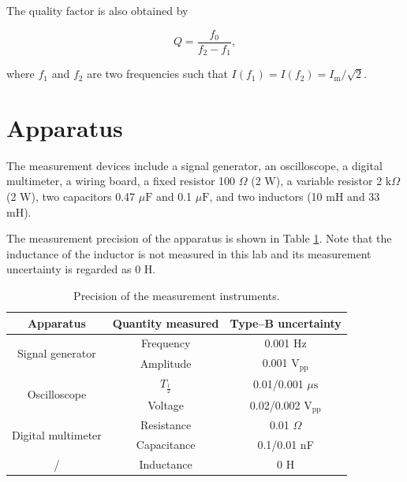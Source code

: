 \documentclass{article}
\begin{document}
The quality factor is also obtained by

\begin{equation}
    Q = \frac{f_0}{f_2 - f_1},
    \label{eq:Qex}
\end{equation}

where $f_1$ and $f_2$ are two frequencies such that $I(f_1) = I(f_2) = I_\text{m}/\sqrt{2}$.



\section{Apparatus}

The measurement devices include a signal generator, an oscilloscope, a digital multimeter, a wiring board, a fixed resistor 100 $\Omega$ (2 W), a variable resistor 2 $\text{k}\Omega$ (2 W), two capacitors 0.47 $\mu \text{F}$ and 0.1 $\mu\text{F}$, and two inductors (10 mH and 33 mH).

The measurement precision of the apparatus is shown in Table \ref{tablePresicion}. Note that the inductance of the inductor is not measured in this lab and its measurement uncertainty is regarded as 0 H.

\begin{table}[H]
    \centering
    \begin{tabular}{ccc}
        \toprule
        Apparatus                           & Quantity measured & Type--B uncertainty               \\
        \midrule
        \multirow{2}{*}{Signal generator}   & Frequency         & 0.001 Hz                          \\
                                            & Amplitude         & 0.001 $\text{V}_{\text{pp}}$      \\ \hline
        \multirow{2}{*}{Oscilloscope}       & $T_{\frac{1}{2}}$ & 0.01/0.001 $\mu\text{s}$          \\
                                            & Voltage           & 0.02/0.002 $\text{V}_{\text{pp}}$ \\ \hline
        \multirow{2}{*}{Digital multimeter} & Resistance        & 0.01 $\Omega$                     \\
                                            & Capacitance       & 0.1/0.01 nF                       \\ \hline
        /                                   & Inductance        & 0 H                               \\
        \bottomrule
    \end{tabular}
    \caption{Precision of the measurement instruments.}\label{tablePresicion}
\end{table}
\end{document}
